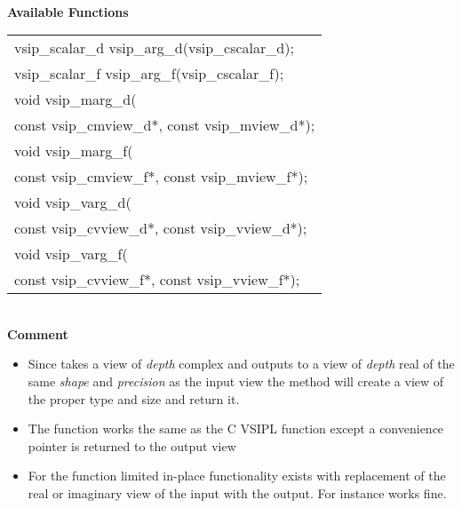 \\\cvsiplh
\newline \hspace*{.8cm} \vspace*{.1cm} \textbf{Available Functions }
\newline \hspace*{1.1cm} {
\ttfamily
\begin{tabular}[H]{l}
vsip\_scalar\_d vsip\_arg\_d(vsip\_cscalar\_d);\\
vsip\_scalar\_f vsip\_arg\_f(vsip\_cscalar\_f);\\
void vsip\_marg\_d(\\*\hspace{.5cm}const vsip\_cmview\_d*, const vsip\_mview\_d*);\\
void vsip\_marg\_f(\\*\hspace{.5cm}const vsip\_cmview\_f*, const vsip\_mview\_f*);\\
void vsip\_varg\_d(\\*\hspace{.5cm}const vsip\_cvview\_d*, const vsip\_vview\_d*);\\
void vsip\_varg\_f(\\*\hspace{.5cm}const vsip\_cvview\_f*, const vsip\_vview\_f*);\\
\end{tabular}
}
\\\pyjvsiph
{}
\newline \hspace*{.8cm}\textbf{Comment}\\
\hspace*{.8cm}\parbox{11cm}{\vspace*{.2cm}
\begin{itemize}
\item{Since  takes a view of \emph{depth} complex and outputs to a view of \emph{depth} real of the same \emph{shape} and \emph{precision} as the input view the  method will create a view of the proper type and size and return it.}
\item{The  function works the same as the C VSIPL function except a convenience pointer is returned to the output view}
\item{For the function limited in-place functionality exists with replacement of the real or imaginary view of the input with the output. For instance  works fine.}
\end{itemize}}
